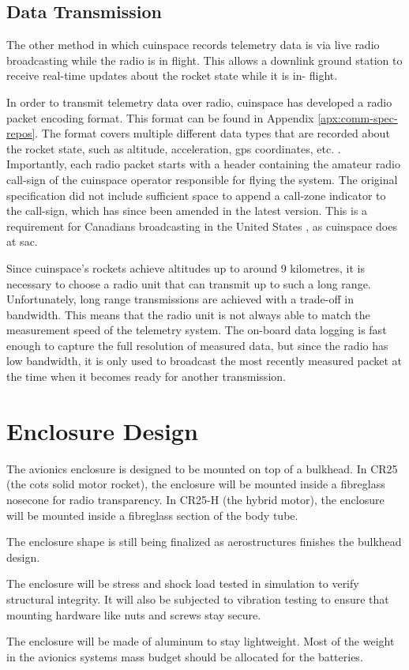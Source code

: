 \subsection{Data Transmission}

The other method in which \gls{cuinspace} records telemetry data is via live radio broadcasting while the radio is in
flight. This allows a downlink ground station to receive real-time updates about the rocket state while it is in-
flight.

In order to transmit telemetry data over radio, \gls{cuinspace} has developed a radio packet encoding format. This
format can be found in Appendix \ref{apx:comm-spec-repos}. The format covers multiple different data types that are
recorded about the rocket state, such as altitude, acceleration, \gls{gps} coordinates, etc. \cite{radio-comms}.
Importantly, each radio packet starts with a header containing the amateur radio call-sign of the \gls{cuinspace}
operator responsible for flying the system. \cite{radio-comms} The original specification did not include sufficient
space to append a call-zone indicator to the call-sign, which has since been amended in the latest version. This is a
requirement for Canadians broadcasting in the United States \cite{foreign-broadcast}, as \gls{cuinspace} does at
\gls{sac}.

Since \gls{cuinspace}'s rockets achieve altitudes up to around 9 kilometres, it is necessary to choose a radio unit
that can transmit up to such a long range. Unfortunately, long range transmissions are achieved with a trade-off in
bandwidth. This means that the radio unit is not always able to match the measurement speed of the telemetry system.
The on-board data logging is fast enough to capture the full resolution of measured data, but since the radio has low
bandwidth, it is only used to broadcast the most recently measured packet at the time when it becomes ready for another
transmission.

\section{Enclosure Design}

The avionics enclosure is designed to be mounted on top of a bulkhead. In CR25 (the \gls{cots} solid motor rocket), the
enclosure will be mounted inside a fibreglass nosecone for radio transparency. In CR25-H (the hybrid motor), the
enclosure will be mounted inside a fibreglass section of the body tube.

The enclosure shape is still being finalized as aerostructures finishes the bulkhead design.

The enclosure will be stress and shock load tested in simulation to verify structural integrity. It will also be
subjected to vibration testing to ensure that mounting hardware like nuts and screws stay secure.

The enclosure will be made of aluminum to stay lightweight. Most of the weight in the avionics systems mass budget
should be allocated for the batteries.
